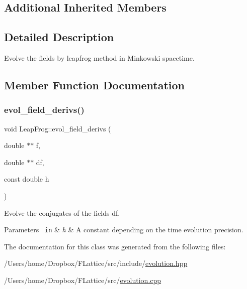 \subsection*{Additional Inherited Members}


\subsection{Detailed Description}
Evolve the fields by leapfrog method in Minkowski spacetime. 

\subsection{Member Function Documentation}
\mbox{\label{class_leap_frog_a0798b7d6bfdf2f19e5bce08c4ce17d29}} 
\subsubsection{\texorpdfstring{evol\_field\_derivs()}{evol\_field\_derivs()}}
{\footnotesize\ttfamily void Leap\+Frog\+::evol\+\_\+field\+\_\+derivs (\begin{DoxyParamCaption}\item[{double $\ast$$\ast$}]{f,  }\item[{double $\ast$$\ast$}]{df,  }\item[{const double}]{h }\end{DoxyParamCaption})\hspace{0.3cm}{\ttfamily [private]}}



Evolve the conjugates of the fields df. 


\begin{DoxyParams}[1]{Parameters}
\mbox{\texttt{ in}}  & {\em h} & A constant depending on the time evolution precision. \\
\hline
\end{DoxyParams}


The documentation for this class was generated from the following files\+:\begin{DoxyCompactItemize}
\item 
/\+Users/home/\+Dropbox/\+F\+Lattice/src/include/\mbox{\hyperlink{evolution_8hpp}{evolution.\+hpp}}\item 
/\+Users/home/\+Dropbox/\+F\+Lattice/src/\mbox{\hyperlink{evolution_8cpp}{evolution.\+cpp}}\end{DoxyCompactItemize}
